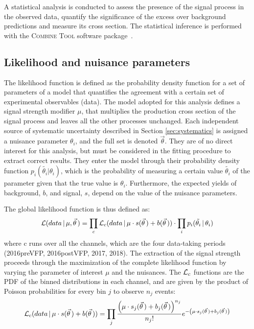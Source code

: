 \label{sec:statistical_analysis}
A statistical analysis is conducted to assess the presence of the signal process in the observed data,
quantify the significance of the excess over background predictions and measure its cross section.
The statistical inference is performed with the \textsc{Combine Tool} software package~\cite{CMS-NOTE-2011-005,CMS-CAT-23-001}.

\providecommand{\poissonpdf}[2]{\ensuremath{ \frac{{#1}^{#2}}{#2!}e^{-#1} }}

\subsection{Likelihood and nuisance parameters}
The likelihood function is defined as the probability density function for a set of parameters of a model
that quantifies the agreement with a certain set of experimental observables (data).
The model adopted for this analysis defines a signal strength modifier $\mu$,
that multiplies the production cross section of the signal process and leaves all the other processes unchanged.
Each independent source of systematic uncertainty described in Section \ref{sec:systematics} is assigned a nuisance parameter $\theta_i$, and the full set is denoted $\vec\theta$.
They are of no direct interest for this analysis, but must be considered in the fitting procedure to extract correct results.
They enter the model through their probability density function $p_i(\tilde{\theta_i}|\theta_i)$,
which is the probability of measuring a certain value $\tilde{\theta_i}$ of the parameter given that the true value is $\theta_i$.
Furthermore, the expected yields of background, $b$, and signal, $s$, depend on the value of the nuisance parameters.

The global likelihood function is thus defined as:
\begin{equation}
  \label{eq:likelihood_full}
  \mathcal{L}(data\, |\, \mu, \vec\theta\,) = \prod_c \mathcal{L}_c(data\, |\, \mu \cdot s(\vec\theta\,) + b(\vec\theta\,)) \cdot \prod_i p_i(\tilde{\theta_i}\, |\, \theta_i)
\end{equation}
where c runs over all the channels, which are the four data-taking periods (2016preVFP, 2016postVFP, 2017, 2018).
The extraction of the signal strength proceeds through the maximization of the complete likelihood function by varying the parameter of interest $\mu$ and the nuisances.
The $\mathcal{L}_c$ functions are the PDF of the binned distributions in each channel, and are given by the product of Poisson probabilities for every bin $j$ to observe $n_j$ events:
\begin{equation}
  \label{eq:likelihood_bin}
  \Likelihood_c(data\, |\, \mu \cdot s(\vec\theta\,) + b(\vec\theta\,)) =
                       \prod_j \poissonpdf{\left( \mu \cdot s_j(\vec\theta\,) + b_j(\vec\theta\,) \right)}{n_j}
\end{equation}

